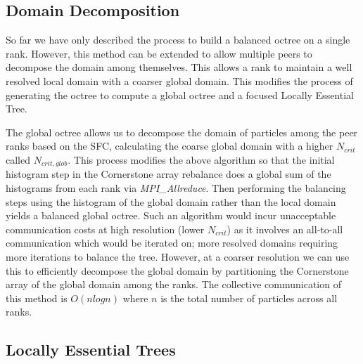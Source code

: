 \subsection{Domain Decomposition}

So far we have only described the process to build a balanced octree on a single rank. However, this method can be extended to allow multiple peers to decompose the domain among themselves. This allows a rank to maintain a well resolved local domain with a coarser global domain. This modifies the process of generating the octree to compute a global octree and a focused Locally Essential Tree. 

The global octree allows us to decompose the domain of particles among the peer ranks based on the SFC, calculating the coarse global domain with a higher $N_{crit}$ called $N_{crit,glob}$. This process modifies the above algorithm so that the initial histogram step in the Cornerstone array rebalance does a global sum of the histograms from each rank via \textit{MPI\_Allreduce}. Then performing the balancing steps using the histogram of the global domain rather than the local domain yields a balanced global octree. Such an algorithm would incur unacceptable communication costs at high resolution (lower $N_{crit}$) as it involves an all-to-all communication which would be iterated on; more resolved domains requiring more iterations to balance the tree. However, at a coarser resolution we can use this to efficiently decompose the global domain by partitioning the Cornerstone array of the global domain among the ranks. The collective communication of this method is $O(nlogn)$ where $n$ is the total number of particles across all ranks.

\subsection{Locally Essential Trees}

